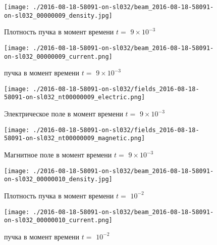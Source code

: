 \documentclass[a4paper,14pt]{extreport}
\begin{document}
\begin{center}
\begin{figure}[!hbt]
\texttt{[image: ./2016-08-18-58091-on-sl032/beam\_2016-08-18-58091-on-sl032\_00000009\_density.jpg]}
\caption{\label{density_beam9_36} Плотность пучка в момент времени $t = $ $9\times 10^{-3}$ }
\end{figure}
\end{center}
\begin{center}
\begin{figure}[!hbt]
\texttt{[image: ./2016-08-18-58091-on-sl032/beam\_2016-08-18-58091-on-sl032\_00000009\_current.png]}
\caption{\label{current_beam9_37}  пучка в момент времени $t = $ $9\times 10^{-3}$ }
\end{figure}
\end{center}
\begin{center}
\begin{figure}[!hbt]
\texttt{[image: ./2016-08-18-58091-on-sl032/fields\_2016-08-18-58091-on-sl032\_nt00000009\_electric.png]}
\caption{\label{electric_9_38} Электрическое поле  в момент времени $t = $ $9\times 10^{-3}$ }
\end{figure}
\end{center}
\begin{center}
\begin{figure}[!hbt]
\texttt{[image: ./2016-08-18-58091-on-sl032/fields\_2016-08-18-58091-on-sl032\_nt00000009\_magnetic.png]}
\caption{\label{magnetic_9_39} Магнитное поле  в момент времени $t = $ $9\times 10^{-3}$ }
\end{figure}
\end{center}
\begin{center}
\begin{figure}[!hbt]
\texttt{[image: ./2016-08-18-58091-on-sl032/beam\_2016-08-18-58091-on-sl032\_00000010\_density.jpg]}
\caption{\label{density_beam10_40} Плотность пучка в момент времени $t = $ $10^{-2}$ }
\end{figure}
\end{center}
\begin{center}
\begin{figure}[!hbt]
\texttt{[image: ./2016-08-18-58091-on-sl032/beam\_2016-08-18-58091-on-sl032\_00000010\_current.png]}
\caption{\label{current_beam10_41}  пучка в момент времени $t = $ $10^{-2}$ }
\end{figure}
\end{center}
\end{document}
